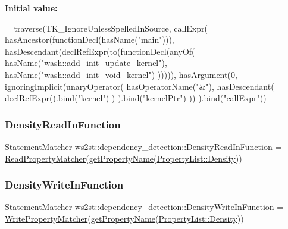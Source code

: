 {\bfseries Initial value\+:}
\begin{DoxyCode}
= traverse(TK\_IgnoreUnlessSpelledInSource, callExpr(
    hasAncestor(functionDecl(hasName(\textcolor{stringliteral}{"main"}))),
    hasDescendant(declRefExpr(to(functionDecl(anyOf(
        hasName(\textcolor{stringliteral}{"wash::add\_init\_update\_kernel"}),
        hasName(\textcolor{stringliteral}{"wash::add\_init\_void\_kernel"})
    ))))),
        hasArgument(0, ignoringImplicit(unaryOperator(
        hasOperatorName(\textcolor{stringliteral}{"&"}),
        hasDescendant(
            declRefExpr().bind(\textcolor{stringliteral}{"kernel"})
        )
    ).bind(\textcolor{stringliteral}{"kernelPtr"}) ))
).bind(\textcolor{stringliteral}{"callExpr"}))
\end{DoxyCode}
\mbox{\label{namespacews2st_1_1dependency__detection_a9759d661026736d642390aab7cc10523}} 
\subsubsection{\texorpdfstring{Density\+Read\+In\+Function}{DensityReadInFunction}}
{\footnotesize\ttfamily Statement\+Matcher ws2st\+::dependency\+\_\+detection\+::\+Density\+Read\+In\+Function = \mbox{\hyperlink{namespacews2st_1_1dependency__detection_aa8821ec3e79b7058ff4ac29b7b5a8374}{Read\+Property\+Matcher}}(\mbox{\hyperlink{namespacews2st_1_1dependency__detection_aa7715a6e777bd59ab78718644a58b1fa}{get\+Property\+Name}}(\mbox{\hyperlink{namespacews2st_1_1dependency__detection_abcddd986f080a9e5c494edfad3c3faf7a7e6d11dd9dbeef53c1cb3cb896bce476}{Property\+List\+::\+Density}}))}

\mbox{\label{namespacews2st_1_1dependency__detection_aca0a180837e6887100d67e6badb54524}} 
\subsubsection{\texorpdfstring{Density\+Write\+In\+Function}{DensityWriteInFunction}}
{\footnotesize\ttfamily Statement\+Matcher ws2st\+::dependency\+\_\+detection\+::\+Density\+Write\+In\+Function = \mbox{\hyperlink{namespacews2st_1_1dependency__detection_a0d8350273a214bbd4586dedadf37ab83}{Write\+Property\+Matcher}}(\mbox{\hyperlink{namespacews2st_1_1dependency__detection_aa7715a6e777bd59ab78718644a58b1fa}{get\+Property\+Name}}(\mbox{\hyperlink{namespacews2st_1_1dependency__detection_abcddd986f080a9e5c494edfad3c3faf7a7e6d11dd9dbeef53c1cb3cb896bce476}{Property\+List\+::\+Density}}))}

